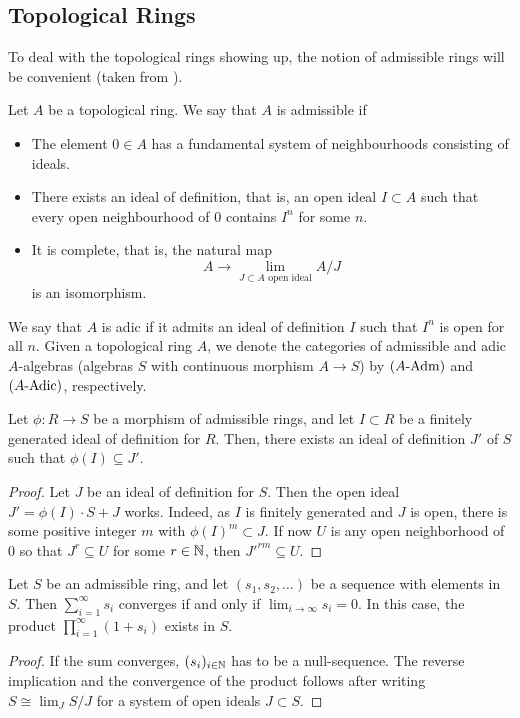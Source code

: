 \documentclass[../main.tex]{subfiles}
\begin{document}
\subsection{Topological Rings}
To deal with the topological rings showing up, the notion of admissible rings
will be convenient (taken from \cite[Tag 07E8]{stacks-project}).
\begin{defi}\label{def:admring}
  Let $A$ be a topological ring. We say that $A$ is admissible if
  \begin{itemize}
    \item The element $0 \in A$ has a fundamental system of neighbourhoods
      consisting of ideals.
    \item There exists an ideal of definition, that is, an open ideal $I
      \subset A$ such that every open neighbourhood of $0$ contains $I^n$ for
      some $n$.
    \item It is complete, that is, the natural map
      \begin{equation*}
        A \to \lim_{J \subset A \text{ open ideal}} A/J
      \end{equation*}
      is an isomorphism.
  \end{itemize}
  We say that $A$ is adic if it admits an ideal of definition $I$ such that 
  $I^n$ is open for all $n$.
  Given a topological ring $A$, we denote the categories of admissible 
  and adic $A$-algebras (algebras $S$ with continuous morphism $A \to S$) by
  ${({A}\textnormal-\allowbreak\mathrm{Adm})}$ and ${({A}\textnormal-\allowbreak\mathrm{Adic})}$, respectively.
\end{defi}

\begin{lem} \label{lem:iodimage}
  Let $\phi\colon R \to S$ be a morphism of admissible rings, and let $I \subset R$
  be a finitely generated ideal of definition for $R$. Then, there exists an
  ideal of definition $J'$ of $S$ such that $\phi(I) \subseteq J'$.
\begin{proof}
  Let $J$ be an ideal of definition for $S$. Then the open
  ideal $J' = \phi(I)\cdot S + J$ works. Indeed, as $I$
  is finitely generated and $J$ is open, there is some positive integer $m$ with $\phi(I)^m \subset J$. If now $U$ is any open neighborhood 
  of $0$ so that $J^r \subseteq U$ for some $r \in \mathbb{N}$, then $J'^{rm} \subseteq U$. 
\end{proof}
\end{lem}

\begin{lem}\label{lem:infiniteseriesandproducts}
  Let $S$ be an admissible ring, and let $(s_1, s_2, \dots)$ be a sequence with
  elements in $S$. Then $\sum_{i = 1}^\infty s_i$ converges if and only if 
   $\lim_{i \to \infty} s_i = 0$. In this case, the product $\prod_{i=1}^\infty (1 + s_i)$
   exists in $S$.
\begin{proof}
  If the sum converges, $(s_i)_{i \in \mathbb{N}}$ has to be a null-sequence. The
  reverse implication and the convergence of the product follows after writing
  $S \cong \lim_{J} S/J$ for a system of open ideals $J \subset S$. 
\end{proof}
\end{lem}
\end{document}
